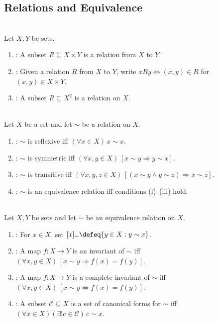 \subsection{Relations and Equivalence}

\begin{definition} \label{def:relations} \\
Let $X,Y$ be sets.
\begin{enumerate}[label=(\roman*)]
\setlength{\itemsep}{0pt}
\item {}: A subset $R\subseteq X\times Y$ is a relation from $X$ to $Y$.
\item {}: Given a relation $R$ from $X$ to $Y$, write $xRy\Longleftrightarrow(x,y)\in R$ for $(x,y)\in X\times Y$.
\item {}: A subset $R\subseteq X^2$ is a relation on $X$.
\end{enumerate}
\end{definition}

\begin{definition} \label{def:equivalence-relation} \\
Let $X$ be a set and let $\sim$ be a relation on $X$.
\begin{enumerate}[label=(\roman*)]
\setlength{\itemsep}{0pt}
\item {}: $\sim$ is reflexive iff $(\forall x\in X)\,x\sim x$.
\item {}: $\sim$ is symmetric iff $(\forall x,y\in X)\,[x\sim y\Rightarrow y\sim x]$.
\item {}: $\sim$ is transitive iff $(\forall x,y,z\in X)\,[(x\sim y\land y\sim z)\Rightarrow x\sim z]$.
\item {}: $\sim$ is an equivalence relation iff conditions (i)--(iii) hold.
\end{enumerate}
\end{definition}

\begin{definition} \label{def:equivalence-classes-invariants-canonical-forms} \\
Let $X,Y$ be sets and let $\sim$ be an equivalence relation on $X$.
\begin{enumerate}[label=(\roman*)]
\setlength{\itemsep}{0pt}
\item {}: For $x\in X$, set $[x]_{\sim}\defeq\{y\in X:y\sim x\}$.
\item {}: A map $f:X\to Y$ is an invariant of $\sim$ iff $(\forall x,y\in X)\,[x\sim y\Rightarrow f(x)=f(y)]$.
\item {}: A map $f:X\to Y$ is a complete invariant of $\sim$ iff $(\forall x,y\in X)\,[x\sim y\Longleftrightarrow f(x)=f(y)]$.
\item {}: A subset $\mathcal{C}\subseteq X$ is a set of canonical forms for $\sim$ iff $(\forall x\in X)(\exists! c\in\mathcal{C})\,c\sim x$.
\end{enumerate}
\end{definition}
